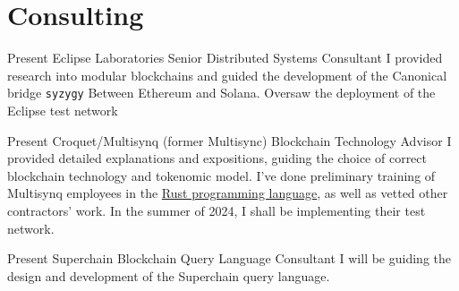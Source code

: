 \documentclass{CurriculumVitae}[10pt, condensed]
\author{Aleksandr Petrosyan} \date{\today}
\begin{document}
\maketitle



\section*{Consulting}

%
{Present}%
{Eclipse Laboratories}%
{Senior Distributed Systems Consultant}%
{%
  I provided research into modular blockchains and guided the
  development of the Canonical bridge \texttt{syzygy} Between Ethereum
  and Solana.  Oversaw the deployment of the Eclipse test network 
}

%
{Present}%
{Croquet/Multisynq (former Multisync)}%
{Blockchain Technology Advisor}%
{%
  I provided detailed explanations and expositions, guiding the choice
  of correct blockchain technology and tokenomic model. I've done
  preliminary training of Multisynq employees in the
  \href{https://github.com/Greybeard-Entertainment/rust}{Rust
    programming language}, as well as vetted other contractors'
  work. In the summer of 2024, I shall be implementing their test
  network.
}%

%
{Present}%
{Superchain}%
{Blockchain Query Language Consultant}%
{
  I will be guiding the design and development of the Superchain query language. 
}


\vfill
\end{document}
